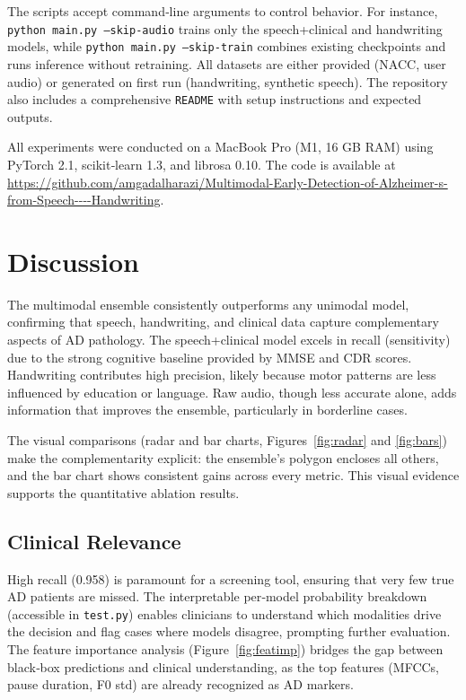 \documentclass[conference]{IEEEtran}
\begin{document}
The scripts accept command‑line arguments to control behavior. For instance, \texttt{python main.py --skip-audio} trains only the speech+clinical and handwriting models, while \texttt{python main.py --skip-train} combines existing checkpoints and runs inference without retraining. All datasets are either provided (NACC, user audio) or generated on first run (handwriting, synthetic speech). The repository also includes a comprehensive \texttt{README} with setup instructions and expected outputs.

All experiments were conducted on a MacBook Pro (M1, 16 GB RAM) using PyTorch 2.1, scikit‑learn 1.3, and librosa 0.10. The code is available at \url{https://github.com/amgadalharazi/Multimodal-Early-Detection-of-Alzheimer-s-from-Speech----Handwriting}.

\section{Discussion}
The multimodal ensemble consistently outperforms any unimodal model, confirming that speech, handwriting, and clinical data capture complementary aspects of AD pathology. The speech+clinical model excels in recall (sensitivity) due to the strong cognitive baseline provided by MMSE and CDR scores. Handwriting contributes high precision, likely because motor patterns are less influenced by education or language. Raw audio, though less accurate alone, adds information that improves the ensemble, particularly in borderline cases.

The visual comparisons (radar and bar charts, Figures~\ref{fig:radar} and \ref{fig:bars}) make the complementarity explicit: the ensemble’s polygon encloses all others, and the bar chart shows consistent gains across every metric. This visual evidence supports the quantitative ablation results.

\subsection{Clinical Relevance}
High recall (0.958) is paramount for a screening tool, ensuring that very few true AD patients are missed. The interpretable per‑model probability breakdown (accessible in \texttt{test.py}) enables clinicians to understand which modalities drive the decision and flag cases where models disagree, prompting further evaluation. The feature importance analysis (Figure~\ref{fig:featimp}) bridges the gap between black‑box predictions and clinical understanding, as the top features (MFCCs, pause duration, F0 std) are already recognized as AD markers.
\end{document}
